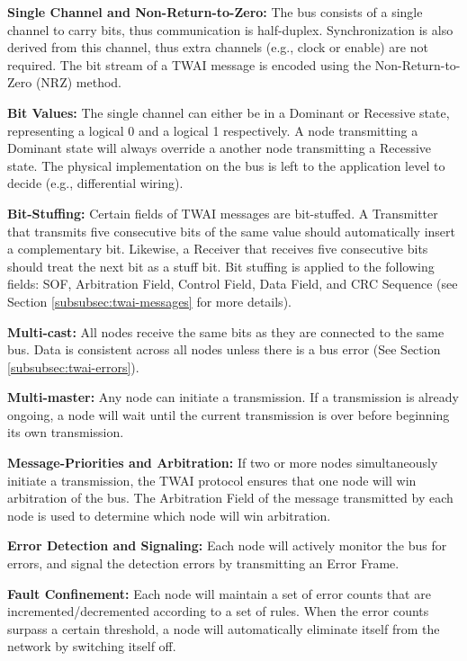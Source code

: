 \documentclass[main\_\_EN.tex]{subfiles}
\begin{document}
{\bfseries Single Channel and Non-Return-to-Zero:} The bus consists of a single channel to carry bits, thus communication is half-duplex. Synchronization is also derived from this channel, thus extra channels (e.g., clock or enable) are not required. The bit stream of a TWAI message is encoded using the Non-Return-to-Zero (NRZ) method.

{\bfseries Bit Values:} The single channel can either be in a Dominant or Recessive state, representing a logical 0 and a logical 1 respectively. A node transmitting a Dominant state will always override a another node transmitting a Recessive state. The physical implementation on the bus is left to the application level to decide (e.g., differential wiring).

{\bfseries Bit-Stuffing:} Certain fields of TWAI messages are bit-stuffed. A Transmitter that transmits five consecutive bits of the same value should automatically insert a complementary bit. Likewise, a Receiver that receives five consecutive bits should treat the next bit as a stuff bit. Bit stuffing is applied to the following fields: SOF, Arbitration Field, Control Field, Data Field, and CRC Sequence (see Section \ref{subsubsec:twai-messages} for more details).

{\bfseries Multi-cast:} All nodes receive the same bits as they are connected to the same bus. Data is consistent across all nodes unless there is a bus error (See Section \ref{subsubsec:twai-errors}).

{\bfseries Multi-master:} Any node can initiate a transmission. If a transmission is already ongoing, a node will wait until the current transmission is over before beginning its own transmission.

{\bfseries Message-Priorities and Arbitration:} If two or more nodes simultaneously initiate a transmission, the TWAI protocol ensures that one node will win arbitration of the bus. The Arbitration Field of the message transmitted by each node is used to determine which node will win arbitration.

{\bfseries Error Detection and Signaling:} Each node will actively monitor the bus for errors, and signal the detection errors by transmitting an Error Frame.

{\bfseries Fault Confinement:} Each node will maintain a set of error counts that are incremented/decremented according to a set of rules. When the error counts surpass a certain threshold, a node will automatically eliminate itself from the network by switching itself off.
\end{document}

